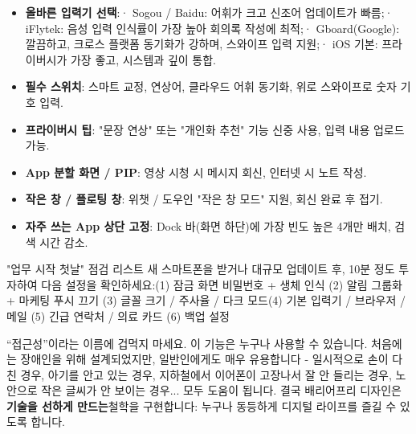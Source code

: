 
\begin{itemize}
  \item \textbf{올바른 입력기 선택}:\newline · Sogou / Baidu: 어휘가 크고 신조어 업데이트가 빠름;\newline · iFlytek: 음성 입력 인식률이 가장 높아 회의록 작성에 최적;\newline · Gboard(Google): 깔끔하고, 크로스 플랫폼 동기화가 강하며, 스와이프 입력 지원;\newline · iOS 기본: 프라이버시가 가장 좋고, 시스템과 깊이 통합.
  \item \textbf{필수 스위치}: 스마트 교정, 연상어, 클라우드 어휘 동기화, 위로 스와이프로 숫자 기호 입력.
  \item \textbf{프라이버시 팁}: "문장 연상" 또는 "개인화 추천" 기능 신중 사용, 입력 내용 업로드 가능.
\end{itemize}


\begin{itemize}
  \item \textbf{App 분할 화면 / PIP}: 영상 시청 시 메시지 회신, 인터넷 시 노트 작성.
  \item \textbf{작은 창 / 플로팅 창}: 위챗 / 도우인 "작은 창 모드" 지원, 회신 완료 후 접기.
  \item \textbf{자주 쓰는 App 상단 고정}: Dock 바(화면 하단)에 가장 빈도 높은 4개만 배치, 검색 시간 감소.
\end{itemize}

\begin{tcbinfo}{"업무 시작 첫날" 점검 리스트}
새 스마트폰을 받거나 대규모 업데이트 후, 10분 정도 투자하여 다음 설정을 확인하세요:\newline (1) 잠금 화면 비밀번호 + 생체 인식 (2) 알림 그룹화 + 마케팅 푸시 끄기 (3) 글꼴 크기 / 주사율 / 다크 모드\newline (4) 기본 입력기 / 브라우저 / 메일 (5) 긴급 연락처 / 의료 카드 (6) 백업 설정

\end{tcbinfo}


“접근성”이라는 이름에 겁먹지 마세요. 이 기능은 누구나 사용할 수 있습니다. 처음에는 장애인을 위해 설계되었지만, 일반인에게도 매우 유용합니다 - 일시적으로 손이 다친 경우, 아기를 안고 있는 경우, 지하철에서 이어폰이 고장나서 잘 안 들리는 경우, 노안으로 작은 글씨가 안 보이는 경우... 모두 도움이 됩니다. 결국 배리어프리 디자인은\textbf{기술을 선하게 만드는}철학을 구현합니다: 누구나 동등하게 디지털 라이프를 즐길 수 있도록 합니다.


